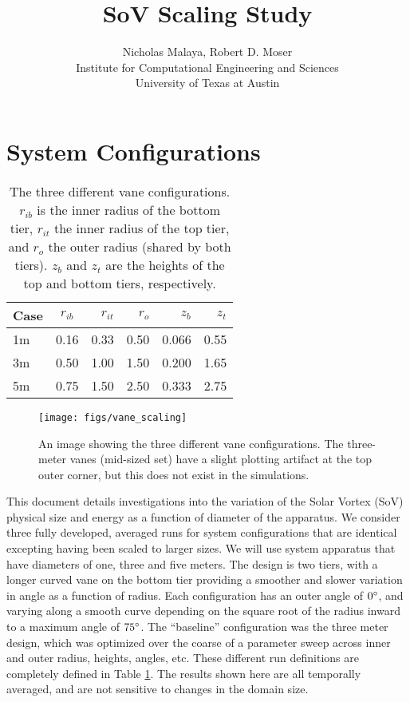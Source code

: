 \documentclass[english]{article}
\title{\bf{SoV Scaling Study}}
\author{Nicholas Malaya, Robert D. Moser \\ Institute for Computational Engineering and Sciences \\ University of Texas at Austin} \date{}
\begin{document}
\maketitle

\section*{System Configurations}

\begin{table}
\begin{centering}
  \begin{tabular}{ | l || c | r | r | r | r |}
    \hline     
    Case & $r_{ib}$ & $r_{it}$ & $r_{o}$ & $z_{b}$ & $z_{t}$ \\ \hline \hline
    1m   & 0.16     & 0.33     & 0.50    & 0.066   & 0.55 \\ \hline
    3m   & 0.50     & 1.00     & 1.50    & 0.200   & 1.65 \\ \hline
    5m   & 0.75     & 1.50     & 2.50    & 0.333   & 2.75 \\
    \hline 
  \end{tabular}
  \caption{The three different vane configurations. $r_{ib}$ is the inner radius of the bottom tier, 
    $r_{it}$ the inner radius of the top tier, and $r_{o}$ the outer radius (shared by both tiers). 
    $z_{b}$ and $z_{t}$ are the heights of the top and bottom tiers, respectively. }\label{fig:scaling_table}
\end{centering}
\end{table}
%

\begin{figure}[!htb]
  \begin{center}
    \texttt{[image: figs/vane\_scaling]}
    \caption{An image showing the three different vane configurations. The three-meter vanes (mid-sized set) 
      have a slight plotting artifact at the top outer corner, but this does not exist in the simulations. }
    \label{vane_scaling}
  \end{center}
\end{figure}


This document details investigations into the variation of the Solar Vortex (SoV) physical size and energy as a function of diameter of the apparatus. We consider 
three fully developed, averaged runs for system configurations that are identical excepting having been scaled to larger sizes. We will use 
system apparatus that have diameters of one, three and five meters. The design is two tiers, with a longer curved vane on the bottom tier providing a 
smoother and slower variation in angle as a function of radius. Each configuration has an outer angle of $0\degree$, and varying along a smooth curve 
depending on the square root of the radius inward to a maximum angle of $75\degree$. The ``baseline'' configuration was the three meter design, 
which was optimized over the coarse of a parameter sweep across inner and outer radius, heights, angles, etc. These different run 
definitions are completely defined in Table \ref{fig:scaling_table}. The results shown here are all temporally averaged, and are not sensitive to changes in the domain size.
\end{document}
